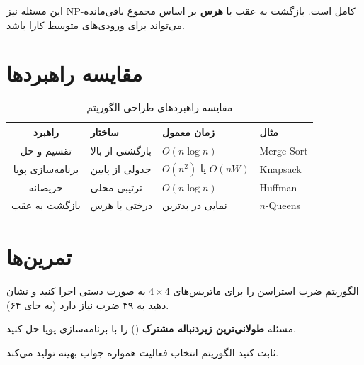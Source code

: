 \documentclass{matinbook}
\begin{document}
    این مسئله نیز NP-کامل است.
    بازگشت به عقب با \textbf{هرس} بر اساس
    مجموع باقی‌مانده می‌تواند برای
    ورودی‌های متوسط کارا باشد.
    
    \section{مقایسه راهبردها}
    
    \begin{table}[h]
        \centering
        \caption{مقایسه راهبردهای طراحی الگوریتم}
        \label{tab:paradigm-comparison}
        \begin{tabular}{|c|C{3cm}|C{3cm}|C{3cm}|}
            \hline
            \textbf{راهبرد} & \textbf{ساختار} & \textbf{زمان معمول} & \textbf{مثال} \\
            \hline
            تقسیم و حل & بازگشتی از بالا & $O(n \log n)$ & Merge Sort \\
            برنامه‌سازی پویا & جدولی از پایین & $O(n^{2})$ یا $O(nW)$ & Knapsack \\
            حریصانه & ترتیبی محلی & $O(n \log n)$ & Huffman \\
            بازگشت به عقب & درختی با هرس & نمایی در بدترین & $n$-Queens \\
            \hline
        \end{tabular}
    \end{table}
    
    \section{تمرین‌ها}
    
    \begin{exercise}
        الگوریتم ضرب استراسن را برای ماتریس‌های
        $4 \times 4$ به صورت دستی اجرا کنید
        و نشان دهید به ۴۹ ضرب نیاز دارد
        (به جای ۶۴).
        \label{exc:strassen-manual}
    \end{exercise}
    
    \begin{exercise}
        مسئله \textbf{طولانی‌ترین زیردنباله مشترک}
        () را با برنامه‌سازی پویا حل کنید.
        \label{exc:lcs}
    \end{exercise}
    
    \begin{exercise}
        ثابت کنید الگوریتم انتخاب فعالیت
        همواره جواب بهینه تولید می‌کند.
        \label{exc:activity-proof}
    \end{exercise}
    
\end{document}
